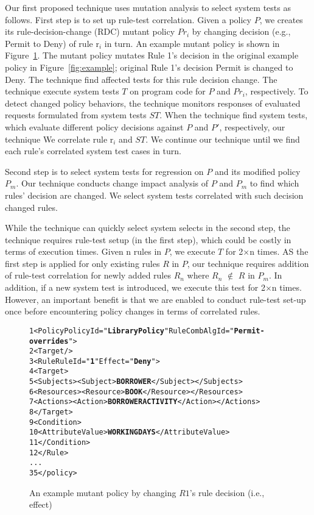 Our first proposed technique uses mutation analysis to select system tests as follows.
First step is to set up rule-test correlation.
Given a policy $P$, we creates its rule-decision-change (RDC) mutant policy $Pr_i$ by changing decision (e.g., Permit to Deny) of rule r$_i$ in turn. An example mutant policy is shown in Figure~\ref{fig:rdcexample}. The mutant policy mutates Rule 1's decision in the original example policy in Figure~\ref{fig:example}; original Rule 1's decision Permit is changed to Deny. The technique find affected tests for this rule decision change. 
The technique execute system tests $T$ on program code for $P$ and $Pr_i$, respectively. To detect changed policy behaviors, the technique monitors responses of evaluated requests formulated from system tests $ST$. When the technique find system tests, which evaluate different policy decisions against $P$ and $P'$, respectively, our technique 
We correlate rule r$_i$ and $ST$.
We continue our technique until we find each rule's correlated system test cases in turn.

Second step is to select system tests for regression on $P$ and its modified policy $P_m$.
Our technique conducts change impact analysis of $P$ and $P_m$ to find which rules' decision are changed.
We select system tests correlated with such decision changed rules.

While the technique can quickly select system selects in the second step, the technique requires rule-test setup (in the first step), which could be costly in terms of execution times. Given n rules in $P$, we execute $T$ for 2$\times$n times. 
AS the first step is applied for only existing rules $R$ in $P$, our technique requires addition of rule-test
correlation for newly added rules $R_n$ where $R_n$ $\notin$ $R$ in $P_m$. 
In addition, if a new system test is introduced, we execute this test for 2$\times$n times.
However, an important benefit is that we are enabled to conduct rule-test set-up once before encountering policy changes in terms of correlated rules. 

\begin{figure}[t]%
\begin{CodeOut}
\begin{alltt}
 1 <Policy PolicyId="\textbf{Library Policy}" RuleCombAlgId="\textbf{Permit-overrides}">
 2  <Target/>
 3    <Rule RuleId="\textbf{1}" Effect="\textbf{Deny}">
 4      <Target>
 5        <Subjects><Subject> \textbf{BORROWER} </Subject></Subjects>
 6        <Resources><Resource> \textbf{BOOK} </Resource></Resources>
 7        <Actions><Action> \textbf{BORROWERACTIVITY} </Action></Actions>
 8      </Target>
 9	    <Condition>
10        <AttributeValue> \textbf{WORKINGDAYS} </AttributeValue>
11      </Condition>
12    </Rule>
...
35 </policy>
\end{alltt}
\end{CodeOut}
\vspace*{-3.0ex} \caption{An example mutant policy by changing $R1$'s rule decision (i.e., effect)}
 \label{fig:rdcexample}
\end{figure}



